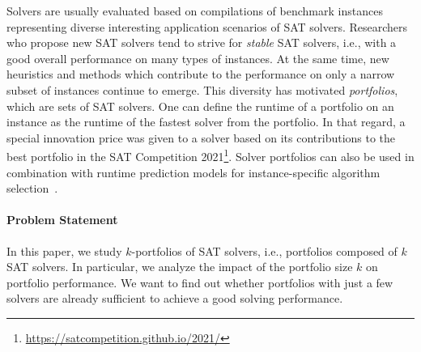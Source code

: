 \documentclass[conference]{IEEEtran}
\begin{document}
Solvers are usually evaluated based on compilations of benchmark instances representing diverse interesting application scenarios of SAT solvers. 
Researchers who propose new SAT solvers tend to strive for \emph{stable} SAT solvers, i.e., with a good overall performance on many types of instances. 
At the same time, new heuristics and methods which contribute to the performance on only a narrow subset of instances continue to emerge. 
This diversity has motivated \emph{portfolios}, which are sets of SAT solvers.
One can define the runtime of a portfolio on an instance as the runtime of the fastest solver from the portfolio. %
In that regard, a special innovation price was given to a solver based on its contributions to the best portfolio in the SAT Competition 2021\footnote{\url{https://satcompetition.github.io/2021/}}. %
Solver portfolios can also be used in combination with runtime prediction models for instance-specific algorithm selection~\cite{xu2008satzilla}. %

\paragraph{Problem Statement}

In this paper, we study $k$-portfolios of SAT solvers, i.e., portfolios composed of $k$ SAT solvers.
In particular, we analyze the impact of the portfolio size $k$ on portfolio performance.
We want to find out whether portfolios with just a few solvers are already sufficient to achieve a good solving performance. %
\end{document}
